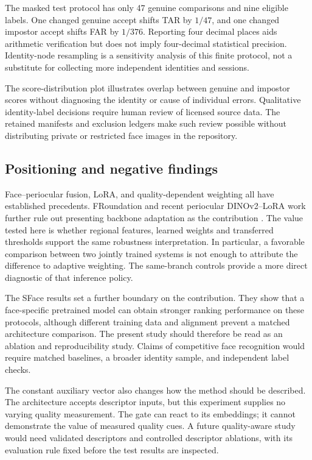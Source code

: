 \documentclass[10pt,journal,compsoc]{IEEEtran}
\begin{document}
The masked test protocol has only 47 genuine comparisons and nine eligible labels. One changed genuine accept shifts TAR by $1/47$, and one changed impostor accept shifts FAR by $1/376$. Reporting four decimal places aids arithmetic verification but does not imply four-decimal statistical precision. Identity-node resampling is a sensitivity analysis of this finite protocol, not a substitute for collecting more independent identities and sessions.

The score-distribution plot illustrates overlap between genuine and impostor scores without diagnosing the identity or cause of individual errors. Qualitative identity-label decisions require human review of licensed source data. The retained manifests and exclusion ledgers make such review possible without distributing private or restricted face images in the repository.

\subsection{Positioning and negative findings}
Face--periocular fusion, LoRA, and quality-dependent weighting all have established precedents. FRoundation and recent periocular DINOv2--LoRA work further rule out presenting backbone adaptation as the contribution \cite{froundation2025,perilora2026}. The value tested here is whether regional features, learned weights and transferred thresholds support the same robustness interpretation. In particular, a favorable comparison between two jointly trained systems is not enough to attribute the difference to adaptive weighting. The same-branch controls provide a more direct diagnostic of that inference policy.

The SFace results set a further boundary on the contribution. They show that a face-specific pretrained model can obtain stronger ranking performance on these protocols, although different training data and alignment prevent a matched architecture comparison. The present study should therefore be read as an ablation and reproducibility study. Claims of competitive face recognition would require matched baselines, a broader identity sample, and independent label checks.

The constant auxiliary vector also changes how the method should be described. The architecture accepts descriptor inputs, but this experiment supplies no varying quality measurement. The gate can react to its embeddings; it cannot demonstrate the value of measured quality cues. A future quality-aware study would need validated descriptors and controlled descriptor ablations, with its evaluation rule fixed before the test results are inspected.
\end{document}
